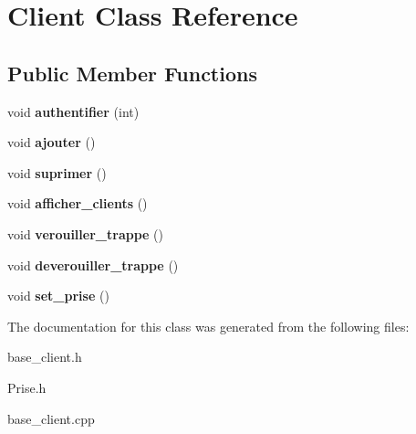 \hypertarget{classClient}{}\section{Client Class Reference}
\label{classClient}
\subsection*{Public Member Functions}
\begin{DoxyCompactItemize}
\item 
\mbox{\label{classClient_aaf591dca3582cbcd83240a090e431b4e}} 
void {\bfseries authentifier} (int)
\item 
\mbox{\label{classClient_a4cd2c9536200e1539d353319bd33ca25}} 
void {\bfseries ajouter} ()
\item 
\mbox{\label{classClient_ac71de4ab4d585f02f312805b4bf2d8f7}} 
void {\bfseries suprimer} ()
\item 
\mbox{\label{classClient_a87d330f26fecac776dd10263cddf95e6}} 
void {\bfseries afficher\+\_\+clients} ()
\item 
\mbox{\label{classClient_a93f6da3ffdd602047297596c4f2ef000}} 
void {\bfseries verouiller\+\_\+trappe} ()
\item 
\mbox{\label{classClient_a33eb66f3a91ffaa74ca835fbbe4e8ae9}} 
void {\bfseries deverouiller\+\_\+trappe} ()
\item 
\mbox{\label{classClient_afddfe419eecf21ee8ef58de84d99eb45}} 
void {\bfseries set\+\_\+prise} ()
\end{DoxyCompactItemize}


The documentation for this class was generated from the following files\+:\begin{DoxyCompactItemize}
\item 
base\+\_\+client.\+h\item 
Prise.\+h\item 
base\+\_\+client.\+cpp\end{DoxyCompactItemize}

